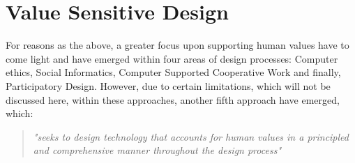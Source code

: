 
\section{Value Sensitive Design}
\label{subsec:vsd_framework}
For reasons as the above, a greater focus upon supporting human values have to come light and have emerged within four areas of design processes: Computer ethics, Social Informatics, Computer Supported Cooperative Work and finally, Participatory Design\citep[p. 3]{FriedmanVSDandIS}. However, due to certain limitations, which will not be discussed here, within these approaches, another fifth approach have emerged, which: 
\begin{quotation}
\textit{"seeks to design technology that accounts for human values in a principled and comprehensive manner throughout the design process"} \citep[p. 1186]{HumanValuesEthicsAndDesign}
\end{quotation}

